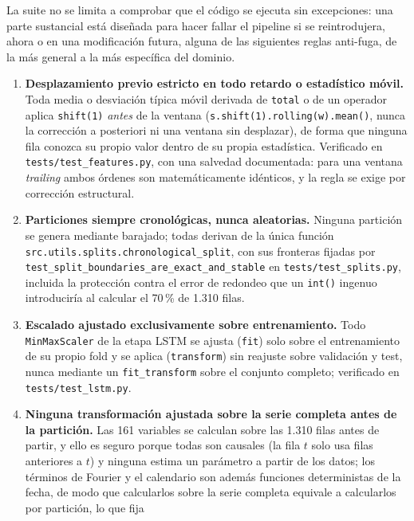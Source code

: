 \begin{sloppypar}
La suite no se limita a comprobar que el código se ejecuta sin excepciones: una parte
sustancial está diseñada para hacer fallar el pipeline si se reintrodujera, ahora o en una
modificación futura, alguna de las siguientes reglas anti-fuga, de la más general a la más
específica del dominio.

\begin{enumerate}
  \item \textbf{Desplazamiento previo estricto en todo retardo o estadístico móvil.}
    Toda media o desviación típica móvil derivada de \texttt{total} o de un operador
    aplica \texttt{shift(1)} \emph{antes} de la ventana
    (\texttt{s.shift(1).rolling(w).mean()}, nunca la corrección a posteriori ni una
    ventana sin desplazar), de forma que ninguna fila conozca su propio valor dentro de
    su propia estadística. Verificado en \texttt{tests/\allowbreak{}test\_features.py},
    con una salvedad documentada: para una ventana \emph{trailing} ambos órdenes son
    matemáticamente idénticos, y la regla se exige por corrección estructural.
  \item \textbf{Particiones siempre cronológicas, nunca aleatorias.} Ninguna partición
    se genera mediante barajado; todas derivan de la única función
    \texttt{src.utils.splits.chronological\_split}, con sus fronteras fijadas por
    \texttt{test\_split\_\allowbreak{}boundaries\_\allowbreak{}are\_\allowbreak{}exact\_\allowbreak{}and\_\allowbreak{}stable}
    en \texttt{tests/\allowbreak{}test\_splits.py}, incluida la protección contra el error
    de redondeo que un \texttt{int()} ingenuo introduciría al calcular el 70\,\% de
    1.310 filas.
  \item \textbf{Escalado ajustado exclusivamente sobre entrenamiento.} Todo
    \texttt{MinMaxScaler} de la etapa LSTM se ajusta (\texttt{fit}) solo sobre el
    entrenamiento de su propio fold y se aplica (\texttt{transform}) sin reajuste sobre
    validación y test, nunca mediante un \texttt{fit\_transform} sobre el conjunto
    completo; verificado en \texttt{tests/\allowbreak{}test\_lstm.py}.
  \item \textbf{Ninguna transformación ajustada sobre la serie completa antes de la
    partición.} Las 161 variables se calculan sobre las 1.310 filas antes de partir, y
    ello es seguro porque todas son causales (la fila $t$ solo usa filas anteriores a
    $t$) y ninguna estima un parámetro a partir de los datos; los términos de Fourier y el
    calendario son además funciones deterministas de la fecha, de modo que calcularlos
    sobre la serie completa equivale a calcularlos por partición, lo que fija

\end{enumerate}
\end{sloppypar}
